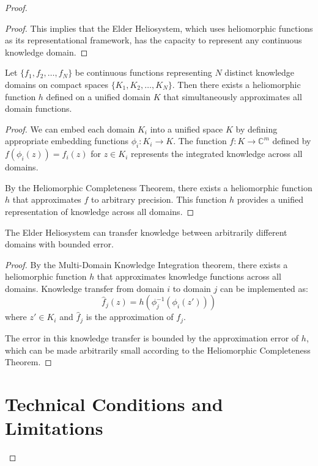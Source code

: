 \begin{proof}
\begin{proof}
This implies that the Elder Heliosystem, which uses heliomorphic functions as its representational framework, has the capacity to represent any continuous knowledge domain.
\end{proof}

\begin{theorem}
Let $\{f_1, f_2, \ldots, f_N\}$ be continuous functions representing $N$ distinct knowledge domains on compact spaces $\{K_1, K_2, \ldots, K_N\}$. Then there exists a heliomorphic function $h$ defined on a unified domain $K$ that simultaneously approximates all domain functions.
\end{theorem}

\begin{proof}
We can embed each domain $K_i$ into a unified space $K$ by defining appropriate embedding functions $\phi_i: K_i \rightarrow K$. The function $f: K \rightarrow \mathbb{C}^m$ defined by $f(\phi_i(z)) = f_i(z)$ for $z \in K_i$ represents the integrated knowledge across all domains.

By the Heliomorphic Completeness Theorem, there exists a heliomorphic function $h$ that approximates $f$ to arbitrary precision. This function $h$ provides a unified representation of knowledge across all domains.
\end{proof}

\begin{corollary}
The Elder Heliosystem can transfer knowledge between arbitrarily different domains with bounded error.
\end{corollary}

\begin{proof}
By the Multi-Domain Knowledge Integration theorem, there exists a heliomorphic function $h$ that approximates knowledge functions across all domains. Knowledge transfer from domain $i$ to domain $j$ can be implemented as:
\begin{equation}
\hat{f}_j(z) = h(\phi_j^{-1}(\phi_i(z')))
\end{equation}
where $z' \in K_i$ and $\hat{f}_j$ is the approximation of $f_j$.

The error in this knowledge transfer is bounded by the approximation error of $h$, which can be made arbitrarily small according to the Heliomorphic Completeness Theorem.
\end{proof}

\section{Technical Conditions and Limitations}


\end{proof}
